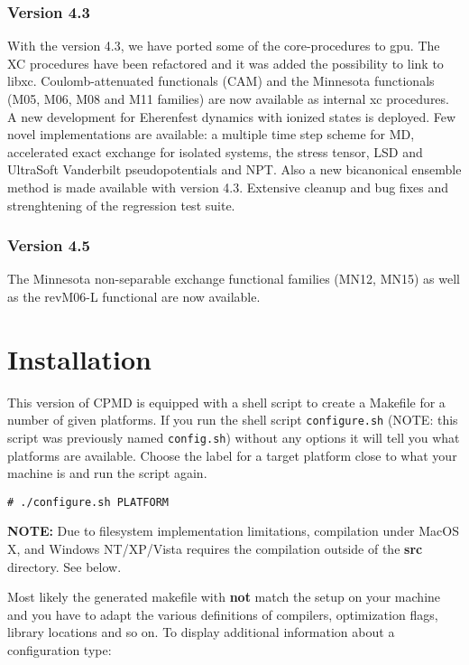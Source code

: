 \documentclass[twoside,10pt,titlepage,a4paper]{article}
\newcommand{\shellcommand}[1]{%
  \vspace*{3mm}
  \noindent
  \texttt{\# #1}
  \vspace*{3mm}
}
\begin{document}
\subsubsection{Version 4.3} 
%
With the version 4.3, we have ported some of the core-procedures to gpu. The XC procedures
have been refactored and it was added the possibility to link to libxc.
Coulomb-attenuated functionals (CAM) and the Minnesota functionals (M05, M06, M08 and
M11 families) are now available as internal xc procedures.
A new development for Eherenfest dynamics with ionized states is deployed.
Few novel implementations are available: a multiple time step scheme for MD,
accelerated exact exchange for isolated systems, 
the stress tensor, LSD and UltraSoft Vanderbilt pseudopotentials and NPT.
Also a new bicanonical ensemble method is made available with version 4.3.
Extensive cleanup and bug fixes and strenghtening of the regression test suite.

%
%
\subsubsection{Version 4.5} 
The Minnesota non-separable exchange functional families (MN12, MN15) as well as the revM06-L functional
are now available.

\clearpage
\section{Installation}\label{installation}
%
This version of CPMD is equipped with a shell script to create 
a Makefile for a number of given platforms. If you run the shell 
script \texttt{configure.sh} (NOTE: this script was previously
named \texttt{config.sh}) without any options it will tell you 
what platforms are available. Choose the label for a target 
platform close to what your machine is and run the script again.

\shellcommand{./configure.sh PLATFORM }

\textbf{NOTE:} Due to filesystem implementation limitations,
compilation under MacOS X, and Windows NT/XP/Vista requires the
compilation outside of the \textbf{src} directory. See below.

Most likely the generated makefile with \textbf{not} match the
setup on your machine and you have to adapt the various definitions 
of compilers, optimization flags, library locations and so on.
To display additional information about a configuration type:
\end{document}
